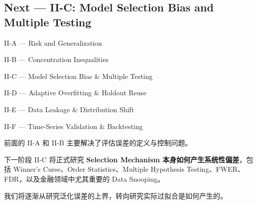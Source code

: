 \hypertarget{part-2-14-0001-next-ii-c-model-selection-bias-and-multiple-testing}{%
\subsection{Next --- II-C: Model Selection Bias and Multiple Testing}\label{part-2-14-0001-next-ii-c-model-selection-bias-and-multiple-testing}}

II-A --- Risk and Generalization

II-B --- Concentration Inequalities

II-C --- Model Selection Bias \& Multiple Testing

II-D --- Adaptive Overfitting \& Holdout Reuse

II-E --- Data Leakage \& Distribution Shift

II-F --- Time-Series Validation \& Backtesting

前面的 II-A 和 II-B 主要解决了评估误差的定义与控制问题。

下一阶段 II-C 将正式研究 \textbf{Selection Mechanism 本身如何产生系统性偏差}，包括 Winner's Curse、Order Statistics、Multiple Hypothesis Testing、FWER、FDR，以及金融领域中尤其重要的 Data Snooping。

我们将逐渐从研究泛化误差的上界，转向研究实际过拟合是如何产生的。
